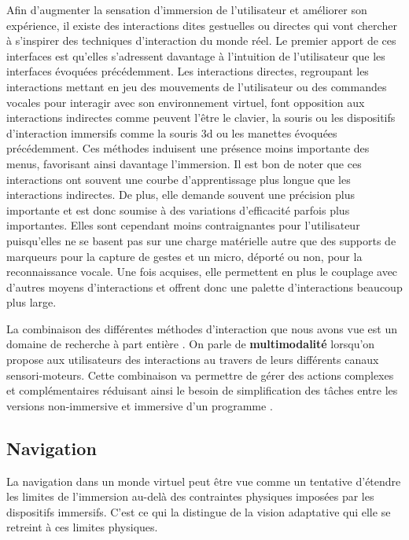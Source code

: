 Afin d'augmenter la sensation d'immersion de l'utilisateur et améliorer son expérience, il existe des interactions dites gestuelles ou directes qui vont chercher à s'inspirer des techniques d'interaction du monde réel. Le premier apport de ces interfaces est qu'elles s'adressent davantage à l'intuition de l'utilisateur que les interfaces évoquées précédemment.
Les interactions directes, regroupant les interactions mettant en jeu des mouvements de l'utilisateur ou des commandes vocales pour interagir avec son environnement virtuel, font opposition aux interactions indirectes comme peuvent l'être le clavier, la souris ou les dispositifs d'interaction immersifs comme la souris 3d ou les manettes évoquées précédemment. Ces méthodes induisent une présence moins importante des menus, favorisant ainsi davantage l'immersion. Il est bon de noter que ces interactions ont souvent une courbe d'apprentissage plus longue que les interactions indirectes. De plus, elle demande souvent une précision plus importante et est donc soumise à des variations d'efficacité parfois plus importantes. Elles sont cependant moins contraignantes pour l'utilisateur puisqu'elles ne se basent pas sur une charge matérielle autre que des supports de marqueurs pour la capture de gestes et un micro, déporté ou non, pour la reconnaissance vocale. Une fois acquises, elle permettent en plus le couplage avec d'autres moyens d'interactions et offrent donc une palette d'interactions beaucoup plus large.

La combinaison des différentes méthodes d'interaction que nous avons vue est un domaine de recherche à part entière \cite{martin_hardware_2014,martin_reconfigurable_2011}. On parle de \textbf{multimodalité} lorsqu'on propose aux utilisateurs des interactions au travers de leurs différents canaux sensori-moteurs. Cette combinaison va permettre de gérer des actions complexes et complémentaires réduisant ainsi le besoin de simplification des tâches entre les versions non-immersive et immersive d'un programme \cite{BOSSARD}.



\subsection{Navigation} \label{navigation}

La navigation dans un monde virtuel peut être vue comme un tentative d'étendre les limites de l'immersion au-delà des contraintes physiques imposées par les dispositifs immersifs. C'est ce qui la distingue de la vision adaptative qui elle se retreint à ces limites physiques. 

